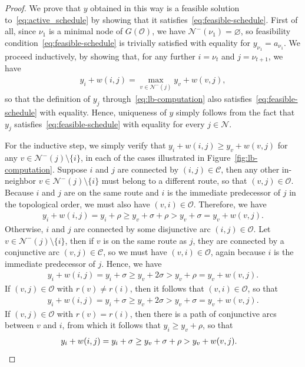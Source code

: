 \documentclass[a4paper]{report}
\theoremstyle{definition}
\theoremstyle{plain}
\begin{document}
\lblemma*
\begin{proof}
  We prove that $y$ obtained in this way is a feasible solution to~\eqref{eq:active_schedule} by
  showing that it satisfies~\eqref{eq:feasible-schedule}.
  First of all, since $\nu_1$ is a minimal node of $G(\mathcal{O})$, we have
  $\mathcal{N}^-(\nu_1) = \varnothing$, so feasibility condition~\eqref{eq:feasible-schedule} is trivially satisfied
  with equality for $y_{\nu_1} = a_{\nu_1}$. We proceed inductively, by showing that,
  for any further $i = \nu_t$ and $j = \nu_{t+1}$, we have
  \begin{align}
    \label{eq:max-arc}
    y_i + w(i,j) = \max_{v \in \mathcal{N}^-(j)} y_v + w(v,j) ,
  \end{align}
  so that the definition of $y_j$ through~\eqref{eq:lb-computation} also
  satisfies~\eqref{eq:feasible-schedule} with equality.
  Hence, uniqueness of $y$ simply follows from the fact that $y_j$
  satisfies~\eqref{eq:feasible-schedule} with equality for every $j \in \mathcal{N}$.

  For the inductive step, we simply verify that
  $y_{i} + w(i,j) \geq y_{v} + w(v,j)$ for any $v \in \mathcal{N}^{-}(j) \setminus \{i\}$, in
  each of the cases illustrated in Figure~\ref{fig:lb-computation}.
  Suppose $i$ and $j$ are connected by $(i,j) \in \mathcal{C}$, then any other
  in-neighbor $v \in \mathcal{N}^-(j) \setminus \{ i \}$ must belong to a different route,
  so that $(v,j) \in \mathcal{O}$. Because $i$ and $j$ are on the same route and
  $i$ is the immediate predecessor of $j$ in the topological order, we must also
  have $(v,i) \in \mathcal{O}$. Therefore, we have
  \begin{align*}
    y_i + w(i,j) = y_i + \rho \geq y_v + \sigma + \rho > y_v + \sigma = y_v + w(v,j) .
  \end{align*}
  Otherwise, $i$ and $j$ are connected by some disjunctive arc
  $(i,j) \in \mathcal{O}$. Let $v \in \mathcal{N}^-(j) \setminus \{i\}$, then if $v$ is on the
  same route as $j$, they are connected by a conjunctive arc
  $(v,j) \in \mathcal{C}$, so we must have $(v,i) \in \mathcal{O}$, again because
  $i$ is the immediate predecessor of $j$. Hence, we have
  \begin{align*}
    y_i + w(i,j) = y_i + \sigma \geq y_v + 2 \sigma > y_{v} + \rho = y_{v} + w(v,j) .
  \end{align*}
  If $(v, j) \in \mathcal{O}$ with $r(v) \neq r(i)$, then it follows that
  $(v,i) \in \mathcal{O}$, so that
  \begin{align*}
    y_{i} + w(i,j) = y_i + \sigma \geq y_v + 2\sigma > y_v + \sigma = y_v + w(v,j) .
  \end{align*}
  If $(v, j) \in \mathcal{O}$ with $r(v) = r(i)$, then there is a path of
  conjunctive arcs between $v$ and $i$, from which it follows that
  $y_i \geq y_{v} + \rho$, so that
  \begin{align*}
    y_i + w(i,j) = y_i + \sigma \geq y_v + \sigma + \rho > y_v + w(v, j) . & \qedhere
  \end{align*}
\end{proof}
\end{document}
